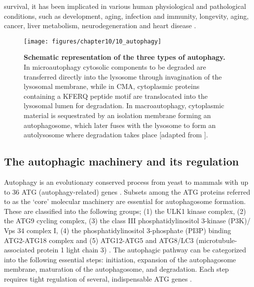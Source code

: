 survival, it has been implicated in various human physiological and pathological conditions, such as development, aging, infection and immunity, longevity, aging, cancer, liver metabolism, neurodegeneration and heart disease \citep{Meijer2006,Mizushima2008,Ravikumar2010b,sarkar2013}.

\begin{figure}[H]
  \texttt{[image: figures/chapter10/10\_autophagy]}
  \caption[Schematic representation of the three types of autophagy]{\textbf{Schematic representation of the three types of autophagy.} In microautophagy cytosolic components to be degraded are transferred directly into the lysosome through invagination of the lysosomal membrane, while in CMA, cytoplasmic proteins containing a KFERQ peptide motif are translocated into the lysosomal lumen for degradation. In macroautophagy, cytoplasmic material is sequestrated by an isolation membrane forming an autophagosome, which later fuses with the lysosome to form an autolysosome where degradation takes place [adapted from \citet{Nikoletopoulou2015}].}
  \label{fig:10_autophagy}
  \end{figure}

\subsection{The autophagic machinery and its regulation}
Autophagy is an evolutionary conserved process from yeast to mammals with up to 36 ATG (autophagy-related) genes \citep{Thumm1994,Tsukada1993,Klionsky2007,Mizushima2010}. Subsets among the ATG proteins referred to as the ‘core’ molecular machinery are essential for autophagosome formation. These are classified into the following groups; (1) the ULK1 kinase complex, (2) the ATG9 cycling complex, (3) the class III phosphatidylinositol 3-kinase (P3K)/ Vps 34 complex I, (4) the phosphatidylinositol 3-phosphate (PI3P) binding ATG2-ATG18 complex and (5) ATG12-ATG5 and ATG8/LC3 (microtubule-associated protein 1 light chain 3) \citep{Feng2014,Yang2010}. The autophagic pathway can be categorized into the following essential steps: initiation, expansion of the autophagosome membrane, maturation of the autophagosome, and degradation. Each step requires tight regulation of several, indispensable  ATG genes  \citep{Feng2014,Maday2014,Parzych2014}. 

